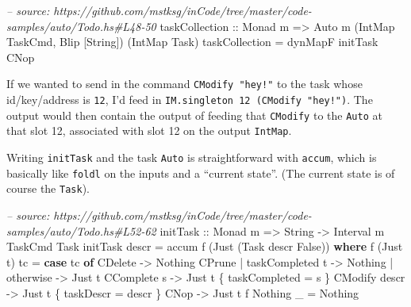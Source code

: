 \documentclass[]{article}
\newenvironment{Shaded}{}{}
\newcommand{\KeywordTok}[1]{\textcolor[rgb]{0.00,0.44,0.13}{\textbf{#1}}}
\newcommand{\DataTypeTok}[1]{\textcolor[rgb]{0.56,0.13,0.00}{#1}}
\newcommand{\CommentTok}[1]{\textcolor[rgb]{0.38,0.63,0.69}{\textit{#1}}}
\newcommand{\OtherTok}[1]{\textcolor[rgb]{0.00,0.44,0.13}{#1}}
\newcommand{\FunctionTok}[1]{\textcolor[rgb]{0.02,0.16,0.49}{#1}}
\newcommand{\NormalTok}[1]{#1}
\begin{document}
\begin{Shaded}
\begin{Highlighting}[]
\CommentTok{-- source: https://github.com/mstksg/inCode/tree/master/code-samples/auto/Todo.hs#L48-50}
\OtherTok{taskCollection ::} \DataTypeTok{Monad}\NormalTok{ m}
               \OtherTok{=>} \DataTypeTok{Auto}\NormalTok{ m (}\DataTypeTok{IntMap} \DataTypeTok{TaskCmd}\NormalTok{, }\DataTypeTok{Blip}\NormalTok{ [}\DataTypeTok{String}\NormalTok{]) (}\DataTypeTok{IntMap} \DataTypeTok{Task}\NormalTok{)}
\NormalTok{taskCollection }\FunctionTok{=}\NormalTok{ dynMapF initTask }\DataTypeTok{CNop}
\end{Highlighting}
\end{Shaded}

If we wanted to send in the command \texttt{CModify\ "hey!"} to the task whose
id/key/address is \texttt{12}, I'd feed in
\texttt{IM.singleton\ 12\ (CModify\ "hey!")}. The output would then contain the
output of feeding that \texttt{CModify} to the \texttt{Auto} at that slot 12,
associated with slot 12 on the output \texttt{IntMap}.

Writing \texttt{initTask} and the task \texttt{Auto} is straightforward with
\texttt{accum}, which is basically like \texttt{foldl} on the inputs and a
``current state''. (The current state is of course the \texttt{Task}).

\begin{Shaded}
\begin{Highlighting}[]
\CommentTok{-- source: https://github.com/mstksg/inCode/tree/master/code-samples/auto/Todo.hs#L52-62}
\OtherTok{initTask ::} \DataTypeTok{Monad}\NormalTok{ m }\OtherTok{=>} \DataTypeTok{String} \OtherTok{->} \DataTypeTok{Interval}\NormalTok{ m }\DataTypeTok{TaskCmd} \DataTypeTok{Task}
\NormalTok{initTask descr }\FunctionTok{=}\NormalTok{ accum f (}\DataTypeTok{Just}\NormalTok{ (}\DataTypeTok{Task}\NormalTok{ descr }\DataTypeTok{False}\NormalTok{))}
  \KeywordTok{where}
\NormalTok{    f (}\DataTypeTok{Just}\NormalTok{ t) tc }\FunctionTok{=} \KeywordTok{case}\NormalTok{ tc }\KeywordTok{of}
                      \DataTypeTok{CDelete}                  \OtherTok{->} \DataTypeTok{Nothing}
                      \DataTypeTok{CPrune} \FunctionTok{|}\NormalTok{ taskCompleted t }\OtherTok{->} \DataTypeTok{Nothing}
                             \FunctionTok{|}\NormalTok{ otherwise       }\OtherTok{->} \DataTypeTok{Just}\NormalTok{ t}
                      \DataTypeTok{CComplete}\NormalTok{ s              }\OtherTok{->} \DataTypeTok{Just}\NormalTok{ t \{ taskCompleted }\FunctionTok{=}\NormalTok{ s \}}
                      \DataTypeTok{CModify}\NormalTok{ descr            }\OtherTok{->} \DataTypeTok{Just}\NormalTok{ t \{ taskDescr }\FunctionTok{=}\NormalTok{ descr \}}
                      \DataTypeTok{CNop}                     \OtherTok{->} \DataTypeTok{Just}\NormalTok{ t}
\NormalTok{    f }\DataTypeTok{Nothing}\NormalTok{ _   }\FunctionTok{=} \DataTypeTok{Nothing}
\end{Highlighting}
\end{Shaded}
\end{document}
